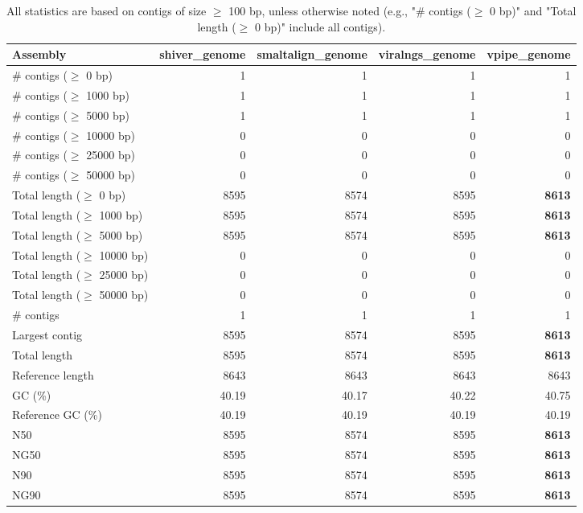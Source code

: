 \documentclass[12pt,a4paper]{article}
\begin{document}
\begin{table}[ht]
\begin{center}
\caption{All statistics are based on contigs of size $\geq$ 100 bp, unless otherwise noted (e.g., "\# contigs ($\geq$ 0 bp)" and "Total length ($\geq$ 0 bp)" include all contigs).}
\begin{tabular}{|l*{4}{|r}|}
\hline
Assembly & shiver\_genome & smaltalign\_genome & viralngs\_genome & vpipe\_genome \\ \hline
\# contigs ($\geq$ 0 bp) & 1 & 1 & 1 & 1 \\ \hline
\# contigs ($\geq$ 1000 bp) & 1 & 1 & 1 & 1 \\ \hline
\# contigs ($\geq$ 5000 bp) & 1 & 1 & 1 & 1 \\ \hline
\# contigs ($\geq$ 10000 bp) & 0 & 0 & 0 & 0 \\ \hline
\# contigs ($\geq$ 25000 bp) & 0 & 0 & 0 & 0 \\ \hline
\# contigs ($\geq$ 50000 bp) & 0 & 0 & 0 & 0 \\ \hline
Total length ($\geq$ 0 bp) & 8595 & 8574 & 8595 & {\bf 8613} \\ \hline
Total length ($\geq$ 1000 bp) & 8595 & 8574 & 8595 & {\bf 8613} \\ \hline
Total length ($\geq$ 5000 bp) & 8595 & 8574 & 8595 & {\bf 8613} \\ \hline
Total length ($\geq$ 10000 bp) & 0 & 0 & 0 & 0 \\ \hline
Total length ($\geq$ 25000 bp) & 0 & 0 & 0 & 0 \\ \hline
Total length ($\geq$ 50000 bp) & 0 & 0 & 0 & 0 \\ \hline
\# contigs & 1 & 1 & 1 & 1 \\ \hline
Largest contig & 8595 & 8574 & 8595 & {\bf 8613} \\ \hline
Total length & 8595 & 8574 & 8595 & {\bf 8613} \\ \hline
Reference length & 8643 & 8643 & 8643 & 8643 \\ \hline
GC (\%) & 40.19 & 40.17 & 40.22 & 40.75 \\ \hline
Reference GC (\%) & 40.19 & 40.19 & 40.19 & 40.19 \\ \hline
N50 & 8595 & 8574 & 8595 & {\bf 8613} \\ \hline
NG50 & 8595 & 8574 & 8595 & {\bf 8613} \\ \hline
N90 & 8595 & 8574 & 8595 & {\bf 8613} \\ \hline
NG90 & 8595 & 8574 & 8595 & {\bf 8613} \\ \hline

\end{tabular}
\end{center}
\end{table}
\end{document}
